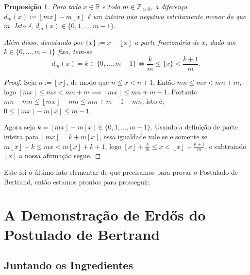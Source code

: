 \documentclass[11pt]{article}
\newtheorem{proposition}[theorem]{Proposição}
\theoremstyle{remark}
\newcommand{\floor}[1]{\left\lfloor #1 \right\rfloor}
\newcommand{\vs}{\vspace{10px}}
\begin{document}
\begin{proposition} \label{prop:difference_floor}
    Para todo $x\in \mathbb R$ e todo $m\in \mathbb Z_{>0}$, a diferença $d_m(x):=\floor{mx}-m\floor{x}$ é um inteiro não negativo estritamente menor do que $m$. Isto é, $d_m(x)\in \{0,1,\ldots, m-1\}$. 
    
    Além disso, denotando por $\{x\}:= x-\floor{x}$ a parte fracionária de $x$, dado um $k\in \{0,\ldots, m-1\}$ fixo, tem-se \[d_m(x)=k\in \{0,\ldots, m-1\}\iff \frac{k}{m}\le \{x\}<\frac{k+1}{m}.\]
\end{proposition}\vs

\begin{proof}
    Seja $n:=\floor{x}$, de modo que $n\le x<n+1$. Então $mn\le mx < mn+m$, logo $\floor{mx}\le mx<mn+m\implies \floor{mx}\le mn+m-1$. Portanto $mn-mn\le \floor{mx}-mn\le mn+m-1-mn$; isto é, $0\le \floor{mx}-m\floor{x}\le m-1$.\vspace{5px}

    Agora seja $k =\floor{mx}-m\floor{x}\in \{0,1,\ldots, m-1\}$. Usando a definição de parte inteira para $\floor{mx}=k+m\floor{x}$, essa igualdade vale se e somente se $m\floor x+k\le mx< m\floor x+k+1$, logo $\floor x+\frac{k}{m}\le x< \floor x+\frac{k+1}{m}$, e subtraindo $\floor x$ a nossa afirmação segue.
\end{proof}\vs

Este foi o último fato elementar de que precisamos para provar o Postulado de Bertrand, então estamos prontos para prosseguir.


\section{A Demonstração de Erd\H{o}s do Postulado de Bertrand}
\subsection{Juntando os Ingredientes}
\end{document}
